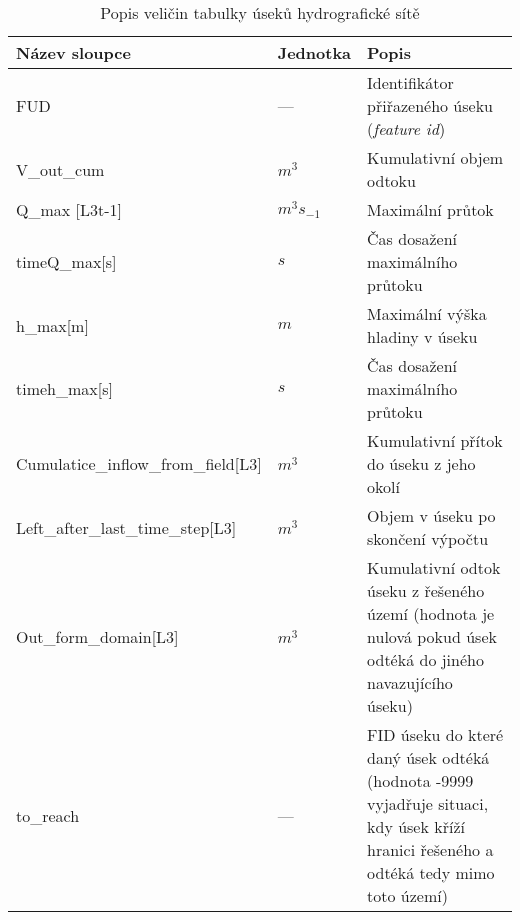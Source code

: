 
\begin{table}[h!]
 

 \centering
 \caption{Popis veličin  tabulky úseků hydrografické sítě}
\label{tab:useky}

 \begin{tabular}{llp{}}
  \hline  \hline
 Název sloupce        & Jednotka     & Popis                                 \\ 
 \hline
 FUD              &   ---      &  Identifikátor přiřazeného úseku ({\it feature id})   \\
 V\_out\_cum           &  $m^3$         & Kumulativní objem odtoku            \\
 Q\_max [L3t-1]    &   $m^3s_{-1}$  & Maximální průtok                    \\
 timeQ\_max[s]          &   $s$          &  Čas dosažení maximálního průtoku    \\
 h\_max[m]        &  $m$  &  Maximální výška hladiny v úseku     \\
 timeh\_max[s]    &  $s$ &  Čas dosažení maximálního průtoku    \\
 Cumulatice\_inflow\_from\_field[L3]         &  $m^3$  &  Kumulativní přítok do úseku z jeho okolí \\
 Left\_after\_last\_time\_step[L3]            &  $m^3$  &  Objem v úseku po skončení výpočtu \\
 Out\_form\_domain[L3]              &  $m^3$     & Kumulativní odtok úseku z řešeného území (hodnota je nulová pokud úsek odtéká do jiného navazujícího úseku)   \\
 to\_reach              &  ---     & FID úseku do které daný úsek odtéká (hodnota -9999 vyjadřuje situaci, kdy úsek kříží hranici řešeného a odtéká tedy mimo toto území) \\
  \hline
   \hline
 \end{tabular}

\end{table}



